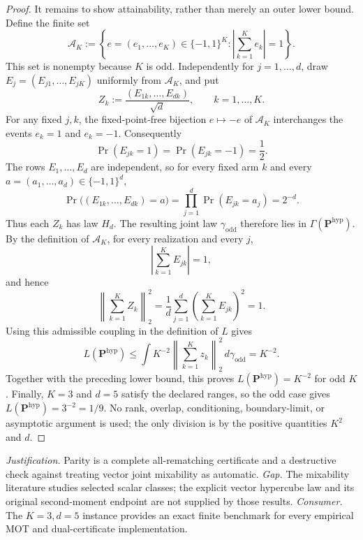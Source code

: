 \documentclass{article}
\begin{document}
\begin{proof}
It remains to show attainability, rather than merely an outer lower bound.  Define the finite set
\[
 \mathcal A_K
 :=\left\{e=(e_1,\ldots,e_K)\in\{-1,1\}^K:
 \left|\sum_{k=1}^K e_k\right|=1\right\}.
\]
This set is nonempty because \(K\) is odd.  Independently for \(j=1,\ldots,d\), draw \(E_j=(E_{j1},\ldots,E_{jK})\) uniformly from \(\mathcal A_K\), and put
\[
 Z_k:=\frac{(E_{1k},\ldots,E_{dk})}{\sqrt d},
 \qquad k=1,\ldots,K.
\]
For any fixed \(j,k\), the fixed-point-free bijection \(e\mapsto-e\) of \(\mathcal A_K\) interchanges the events \(e_k=1\) and \(e_k=-1\).  Consequently
\[
 \Pr(E_{jk}=1)=\Pr(E_{jk}=-1)=\frac12.
\]
The rows \(E_1,\ldots,E_d\) are independent, so for every fixed arm \(k\) and every \(a=(a_1,\ldots,a_d)\in\{-1,1\}^d\),
\[
 \Pr\bigl((E_{1k},\ldots,E_{dk})=a\bigr)
 =\prod_{j=1}^d\Pr(E_{jk}=a_j)=2^{-d}.
\]
Thus each \(Z_k\) has law \(H_d\).  The resulting joint law \(\gamma_{\mathrm{odd}}\) therefore lies in \(\Gamma(\mathbf P^{\mathrm{hyp}})\).  By the definition of \(\mathcal A_K\), for every realization and every \(j\),
\[
 \left|\sum_{k=1}^K E_{jk}\right|=1,
\]
and hence
\[
 \left\|\sum_{k=1}^K Z_k\right\|_2^2
 =\frac1d\sum_{j=1}^d
 \left(\sum_{k=1}^K E_{jk}\right)^2
 =1.
\]
Using this admissible coupling in the definition of \(L\) gives
\[
 L(\mathbf P^{\mathrm{hyp}})
 \le \int K^{-2}\left\|\sum_{k=1}^Kz_k\right\|_2^2
 \,d\gamma_{\mathrm{odd}}
 =K^{-2}.
\]
Together with the preceding lower bound, this proves \(L(\mathbf P^{\mathrm{hyp}})=K^{-2}\) for odd \(K\).  Finally, \(K=3\) and \(d=5\) satisfy the declared ranges, so the odd case gives \(L(\mathbf P^{\mathrm{hyp}})=3^{-2}=1/9\).  No rank, overlap, conditioning, boundary-limit, or asymptotic argument is used; the only division is by the positive quantities \(K^2\) and \(d\).
\end{proof}
\par\smallskip\noindent \textit{Justification.} Parity is a complete all-rematching certificate and a destructive check against treating vector joint mixability as automatic. \textit{Gap.} The mixability literature studies selected scalar classes; the explicit vector hypercube law and its original second-moment endpoint are not supplied by those results. \textit{Consumer.} The \(K=3,d=5\) instance provides an exact finite benchmark for every empirical MOT and dual-certificate implementation.
\end{document}

